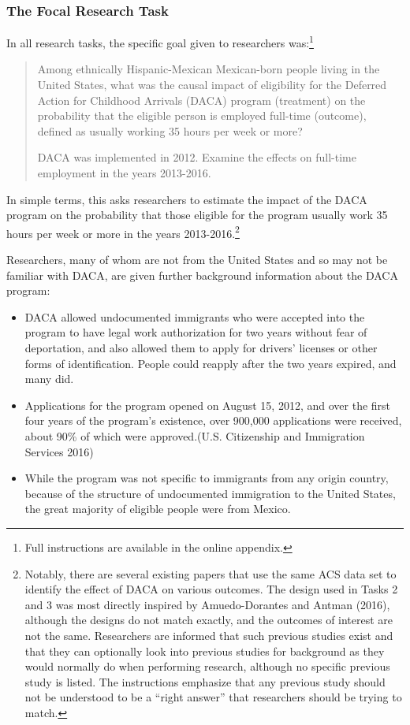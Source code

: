 \documentclass[
  letterpaper,
  DIV=11,
  numbers=noendperiod]{scrartcl}
\begin{document}
\hypertarget{the-focal-research-task}{%
\subsubsection{The Focal Research Task}\label{the-focal-research-task}}

\label{sec:focaltask}

In all research tasks, the specific goal given to researchers
was:\footnote{Full instructions are available in the online appendix.}

\begin{quote}
Among ethnically Hispanic-Mexican Mexican-born people living in the
United States, what was the causal impact of eligibility for the
Deferred Action for Childhood Arrivals (DACA) program (treatment) on the
probability that the eligible person is employed full-time (outcome),
defined as usually working 35 hours per week or more?

DACA was implemented in 2012. Examine the effects on full-time
employment in the years 2013-2016.
\end{quote}

In simple terms, this asks researchers to estimate the impact of the
DACA program on the probability that those eligible for the program
usually work 35 hours per week or more in the years
2013-2016.\footnote{Notably, there are several existing papers that use
  the same ACS data set to identify the effect of DACA on various
  outcomes. The design used in Tasks 2 and 3 was most directly inspired
  by Amuedo-Dorantes and Antman (2016), although the designs do not
  match exactly, and the outcomes of interest are not the same.
  Researchers are informed that such previous studies exist and that
  they can optionally look into previous studies for background as they
  would normally do when performing research, although no specific
  previous study is listed. The instructions emphasize that any previous
  study should not be understood to be a ``right answer'' that
  researchers should be trying to match.}

Researchers, many of whom are not from the United States and so may not
be familiar with DACA, are given further background information about
the DACA program:

\begin{itemize}
\item
  DACA allowed undocumented immigrants who were accepted into the
  program to have legal work authorization for two years without fear of
  deportation, and also allowed them to apply for drivers' licenses or
  other forms of identification. People could reapply after the two
  years expired, and many did.
\item
  Applications for the program opened on August 15, 2012, and over the
  first four years of the program's existence, over 900,000 applications
  were received, about 90\% of which were approved.(U.S. Citizenship and
  Immigration Services 2016)
\item
  While the program was not specific to immigrants from any origin
  country, because of the structure of undocumented immigration to the
  United States, the great majority of eligible people were from Mexico.
\end{itemize}
\end{document}
